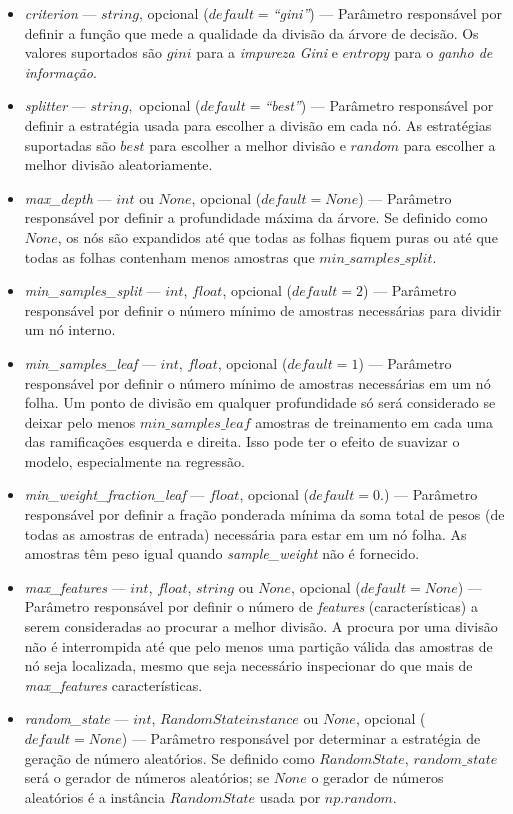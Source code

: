 \documentclass[
	12pt,				%
	oneside,			%
	a4paper,			%
	english,			%
	brazil				%
	]{abntex2ppgsi}
\begin{document}
{{\begin{apendicesenv}
\begin{itemize}
\item \textit{criterion} --- $string$, opcional ($default=$\textit{``gini''}) --- Parâmetro responsável por definir a função que mede a qualidade da divisão da árvore de decisão. Os valores suportados são $gini$ para a \textit{impureza Gini} e $entropy$ para o \textit{ganho de informação}.
\item \textit{splitter} --- $string,$ opcional ($default=$\textit{``best''}) --- Parâmetro responsável por definir a estratégia usada para escolher a divisão em cada nó. As estratégias suportadas são $best$ para escolher a melhor divisão e $random$ para escolher a melhor divisão aleatoriamente.
\item \textit{max\_depth} --- $int$ ou $None$, opcional ($default=None$) --- Parâmetro responsável por definir a profundidade máxima da árvore. Se definido como $None$, os nós são expandidos até que todas as folhas fiquem puras ou até que todas as folhas contenham menos amostras que $min\_samples\_split$.
\item \textit{min\_samples\_split} --- $int$, $float$, opcional ($default=2$) --- Parâmetro responsável por definir o número mínimo de amostras necessárias para dividir um nó interno.
\item \textit{min\_samples\_leaf} --- $int$, $float$, opcional ($default=1$) --- Parâmetro responsável por definir o número mínimo de amostras necessárias em um nó folha. Um ponto de divisão em qualquer profundidade só será considerado se deixar pelo menos $min\_samples\_leaf$ amostras de treinamento em cada uma das ramificações esquerda e direita. Isso pode ter o efeito de suavizar o modelo, especialmente na regressão.
\item \textit{min\_weight\_fraction\_leaf} --- $float$, opcional ($default=0.$) --- Parâmetro responsável por definir a fração ponderada mínima da soma total de pesos (de todas as amostras de entrada) necessária para estar em um nó folha. As amostras têm peso igual quando \textit{sample\_weight} não é fornecido.
\item \textit{max\_features} --- $int$, $float$, $string$ ou $None$, opcional ($default=None$) --- Parâmetro responsável por definir o número de \textit{features} (características) a serem consideradas ao procurar a melhor divisão. A procura por uma divisão não é interrompida até que pelo menos uma partição válida das amostras de nó seja localizada, mesmo que seja necessário inspecionar do que mais de \textit{max\_features} características.
\item \textit{random\_state} --- $int$, $RandomState instance$ ou $None$, opcional ($default=None$) --- Parâmetro responsável por determinar a estratégia de geração de número aleatórios. Se definido como $RandomState$, $random\_state$ será o gerador de números aleatórios; se $None$ o gerador de números aleatórios é a instância $RandomState$ usada por $np.random$.

\end{itemize}
\end{apendicesenv}}}
\end{document}

